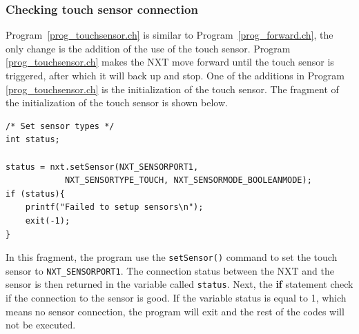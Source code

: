 \documentclass[11pt]{article}
\begin{document}
\subsubsection*{Checking touch sensor connection}
Program~\ref{prog_touchsensor.ch} is similar to Program~\ref{prog_forward.ch}, 
the only change is the addition of the use of the touch sensor. Program~
\ref{prog_touchsensor.ch} makes the NXT move forward until the touch sensor is 
triggered, after which it will back up and stop. One of the additions in Program~
\ref{prog_touchsensor.ch} is the initialization of the touch sensor. The fragment 
of the initialization of the touch sensor is shown below.
\begin{lstlisting}
/* Set sensor types */
int status;

status = nxt.setSensor(NXT_SENSORPORT1, 
            NXT_SENSORTYPE_TOUCH, NXT_SENSORMODE_BOOLEANMODE);
if (status){
    printf("Failed to setup sensors\n");
    exit(-1);
}
\end{lstlisting}
In this fragment, the program use the {\tt setSensor()} command to set the touch 
sensor to {\tt NXT\_SENSORPORT1}. The connection status between the NXT and the 
sensor is then returned in the variable called {\tt status}. Next, the {\bf if} 
statement check if the connection to the sensor is good. If the variable status 
is equal to 1, which means no sensor connection, the program will exit and the 
rest of the codes will not be executed.
 
\end{document}
